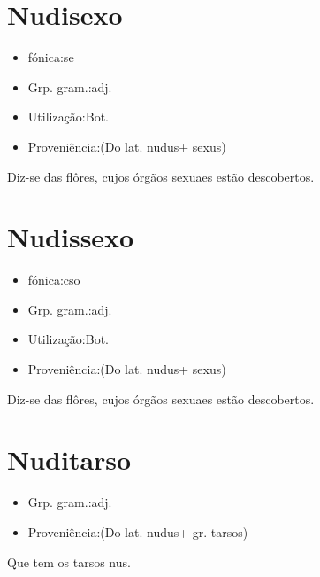 \section{Nudisexo}
\begin{itemize}
\item {fónica:se}
\end{itemize}
\begin{itemize}
\item {Grp. gram.:adj.}
\end{itemize}
\begin{itemize}
\item {Utilização:Bot.}
\end{itemize}
\begin{itemize}
\item {Proveniência:(Do lat. \textunderscore nudus\textunderscore  + \textunderscore sexus\textunderscore )}
\end{itemize}
Diz-se das flôres, cujos órgãos sexuaes estão descobertos.
\section{Nudissexo}
\begin{itemize}
\item {fónica:cso}
\end{itemize}
\begin{itemize}
\item {Grp. gram.:adj.}
\end{itemize}
\begin{itemize}
\item {Utilização:Bot.}
\end{itemize}
\begin{itemize}
\item {Proveniência:(Do lat. \textunderscore nudus\textunderscore  + \textunderscore sexus\textunderscore )}
\end{itemize}
Diz-se das flôres, cujos órgãos sexuaes estão descobertos.
\section{Nuditarso}
\begin{itemize}
\item {Grp. gram.:adj.}
\end{itemize}
\begin{itemize}
\item {Proveniência:(Do lat. \textunderscore nudus\textunderscore  + gr. \textunderscore tarsos\textunderscore )}
\end{itemize}
Que tem os tarsos nus.
